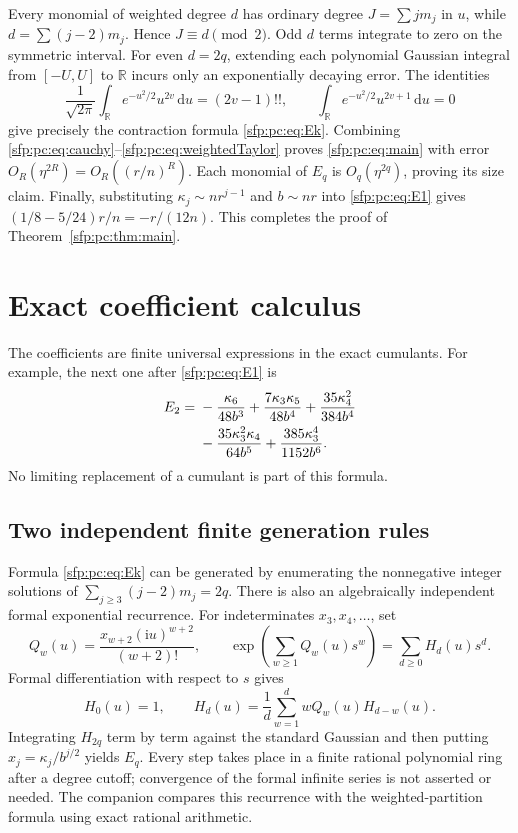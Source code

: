 \documentclass[11pt,letterpaper]{article}
\numberwithin{equation}{section}
\theoremstyle{definition}\newtheorem{definition}[theorem]{Definition}
\theoremstyle{remark}\newtheorem{remark}[theorem]{Remark}
\newcommand{\dd}{\,\mathrm d}
\newcommand{\ii}{\mathrm i}
\begin{document}
Every monomial of weighted degree $d$ has ordinary degree
$J=\sum j m_j$ in $u$, while
$d=\sum(j-2)m_j$. Hence $J\equiv d\pmod2$.
Odd $d$ terms integrate to zero on the symmetric interval.
For even $d=2q$, extending each polynomial Gaussian integral from
$[-U,U]$ to $\mathbb R$ incurs only an exponentially decaying
error. The identities
\begin{equation}\label{sfp:pc:eq:Gaussian}
 \frac1{\sqrt{2\pi}}\int_{\mathbb R}e^{-u^2/2}u^{2v}\dd u
     =(2v-1)!!,\qquad
 \int_{\mathbb R}e^{-u^2/2}u^{2v+1}\dd u=0
\end{equation}
give precisely the contraction formula \eqref{sfp:pc:eq:Ek}.
Combining \eqref{sfp:pc:eq:cauchy}--\eqref{sfp:pc:eq:weightedTaylor} proves
\eqref{sfp:pc:eq:main} with error $O_R(\eta^{2R})=O_R((r/n)^R)$.
Each monomial of $E_q$ is $O_q(\eta^{2q})$, proving its size
claim. Finally, substituting $\kappa_j\sim nr^{j-1}$ and
$b\sim nr$ into \eqref{sfp:pc:eq:E1} gives
$(1/8-5/24)r/n=-r/(12n)$. This completes the proof of
Theorem~\ref{sfp:pc:thm:main}.

\section{Exact coefficient calculus}\label{sfp:pc:sec:coefficients}

The coefficients are finite universal expressions in the exact
cumulants. For example, the next one after \eqref{sfp:pc:eq:E1} is
\begin{align}\label{sfp:pc:eq:E2}
 E_2={}&-\frac{\kappa_6}{48b^3}
      +\frac{7\kappa_3\kappa_5}{48b^4}
      +\frac{35\kappa_4^2}{384b^4}\notag\\
     &-\frac{35\kappa_3^2\kappa_4}{64b^5}
      +\frac{385\kappa_3^4}{1152b^6}.
\end{align}
No limiting replacement of a cumulant is part of this formula.

\subsection{Two independent finite generation rules}

Formula \eqref{sfp:pc:eq:Ek} can be generated by enumerating the
nonnegative integer solutions of
$\sum_{j\geq3}(j-2)m_j=2q$. There is also an algebraically
independent formal exponential recurrence. For indeterminates
$x_3,x_4,\ldots$, set
\begin{equation}\label{sfp:pc:eq:formalQ}
 Q_w(u)=\frac{x_{w+2}(\ii u)^{w+2}}{(w+2)!},\qquad
 \exp\left(\sum_{w\geq1}Q_w(u)s^w\right)
     =\sum_{d\geq0}H_d(u)s^d.
\end{equation}
Formal differentiation with respect to $s$ gives
\begin{equation}\label{sfp:pc:eq:formalrecurrence}
 H_0(u)=1,\qquad
 H_d(u)=\frac1d\sum_{w=1}^d wQ_w(u)H_{d-w}(u).
\end{equation}
Integrating $H_{2q}$ term by term against the standard Gaussian
and then putting $x_j=\kappa_j/b^{j/2}$ yields $E_q$.
Every step takes place in a finite rational polynomial ring after
a degree cutoff; convergence of the formal infinite series is not
asserted or needed. The companion compares this recurrence with
the weighted-partition formula using exact rational arithmetic.
\end{document}
